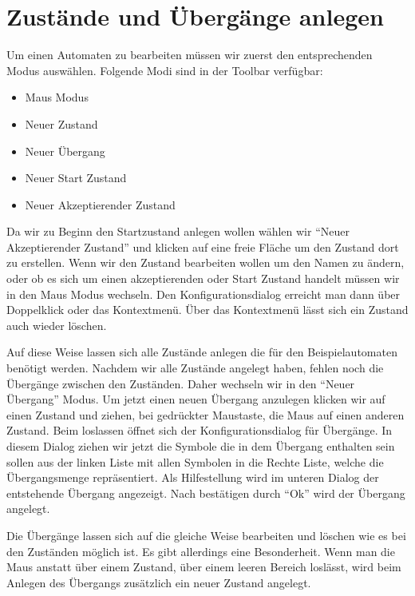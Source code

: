 \section{Zustände und Übergänge anlegen}

Um einen Automaten zu bearbeiten müssen wir zuerst den entsprechenden Modus
auswählen. Folgende Modi sind in der Toolbar verfügbar:

\begin{itemize}
  \item Maus Modus
  \item Neuer Zustand
  \item Neuer Übergang
  \item Neuer Start Zustand
  \item Neuer Akzeptierender Zustand
\end{itemize}

Da wir zu Beginn den Startzustand anlegen wollen wählen wir "`Neuer Akzeptierender
Zustand"' und klicken auf eine freie Fläche um den Zustand dort zu erstellen.
Wenn wir den Zustand bearbeiten wollen um den Namen zu ändern, oder ob es sich
um einen akzeptierenden oder Start Zustand handelt müssen wir in den Maus Modus
wechseln. Den Konfigurationsdialog erreicht man dann über Doppelklick oder das
Kontextmenü. Über das Kontextmenü lässt sich ein Zustand auch wieder
löschen.\vspace{10pt}

Auf diese Weise lassen sich alle Zustände anlegen die für den Beispielautomaten
benötigt werden. Nachdem wir alle Zustände angelegt haben, fehlen noch die
Übergänge zwischen den Zuständen. Daher wechseln wir in den "`Neuer Übergang"'
Modus. Um jetzt einen neuen Übergang anzulegen klicken wir auf einen Zustand 
und ziehen, bei gedrückter Maustaste, die Maus auf einen anderen Zustand. Beim
loslassen öffnet sich der Konfigurationsdialog für Übergänge. In diesem Dialog 
ziehen wir jetzt die Symbole die in dem Übergang enthalten sein sollen aus der 
linken Liste mit allen Symbolen in die Rechte Liste, welche die Übergangsmenge
repräsentiert. Als Hilfestellung wird im unteren Dia\-log der entstehende
Übergang angezeigt. Nach bestätigen durch "`Ok"' wird der Übergang angelegt.\vspace{10pt}

Die Übergänge lassen sich auf die gleiche Weise bearbeiten und löschen wie
es bei den Zuständen möglich ist. Es gibt allerdings eine Besonderheit. Wenn
man die Maus anstatt über einem Zustand, über einem leeren Bereich
loslässt, wird beim Anlegen des Übergangs zusätzlich ein neuer Zustand
angelegt.\vspace{10pt}

